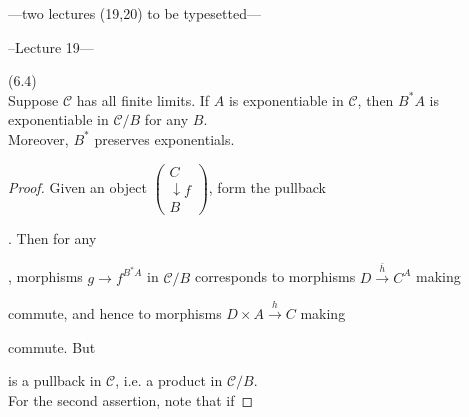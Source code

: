 \documentclass[a4paper]{article}
\begin{document}
---two lectures (19,20) to be typesetted---

--Lecture 19---

\begin{lemma} (6.4)\\
    Suppose $\mathcal{C}$ has all finite limits. If $A$ is exponentiable in $\mathcal{C}$, then $B^*A$ is exponentiable in $\mathcal{C}/B$ for any $B$.\\
    Moreover, $B^*$ preserves exponentials.
    \begin{proof}
        Given an object $\begin{pmatrix}C\\\downarrow f\\B\end{pmatrix}$, form the pullback
            . Then for any 
            , morphisms $g \to f^{B^*A}$ in $\mathcal{C}/B$ corresponds to morphisms $D \xrightarrow{\bar{h}} C^A$ making 
            commute, and hence to morphisms $D \times A \xrightarrow{h} C$ making
            commute. But
            is a pullback in $\mathcal{C}$, i.e. a product in $\mathcal{C}/B$.\\
            For the second assertion, note that if 

\end{proof}
\end{lemma}
\end{document}
